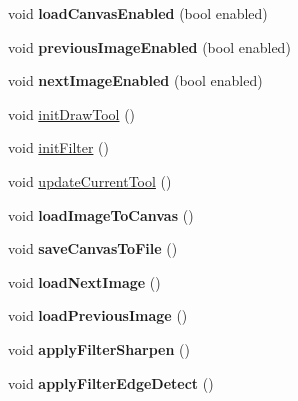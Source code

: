 \begin{DoxyCompactItemize}
\item 
void {\bfseries load\+Canvas\+Enabled} (bool enabled)\hypertarget{classMIAApp_ad1e12340d80aff74cd84757fa23abc25}{}\label{classMIAApp_ad1e12340d80aff74cd84757fa23abc25}

\item 
void {\bfseries previous\+Image\+Enabled} (bool enabled)\hypertarget{classMIAApp_a14aff5b7c19330a72f0f94a838ffd05a}{}\label{classMIAApp_a14aff5b7c19330a72f0f94a838ffd05a}

\item 
void {\bfseries next\+Image\+Enabled} (bool enabled)\hypertarget{classMIAApp_aea869031fb947572040fe6bdb4c9a6a5}{}\label{classMIAApp_aea869031fb947572040fe6bdb4c9a6a5}

\item 
void \hyperlink{classMIAApp_ae9f573664b63d839f34a97a55cfc305a}{init\+Draw\+Tool} ()
\item 
void \hyperlink{classMIAApp_a5f25e06a32d646e407474f24b8ecf43d}{init\+Filter} ()
\item 
void \hyperlink{classMIAApp_aef9e427d5b1279cf9e6fe4d17570a828}{update\+Current\+Tool} ()
\item 
void {\bfseries load\+Image\+To\+Canvas} ()\hypertarget{classMIAApp_a911e8d9fe5ef5d7c0fe4680eabd42052}{}\label{classMIAApp_a911e8d9fe5ef5d7c0fe4680eabd42052}

\item 
void {\bfseries save\+Canvas\+To\+File} ()\hypertarget{classMIAApp_a4003f9ceb1dc298abf847f69ab259608}{}\label{classMIAApp_a4003f9ceb1dc298abf847f69ab259608}

\item 
void {\bfseries load\+Next\+Image} ()\hypertarget{classMIAApp_a57ef88e2558ed69fe0ee4296dbf21bd6}{}\label{classMIAApp_a57ef88e2558ed69fe0ee4296dbf21bd6}

\item 
void {\bfseries load\+Previous\+Image} ()\hypertarget{classMIAApp_a0338ac2b7f4a79ce17f505673a7e4392}{}\label{classMIAApp_a0338ac2b7f4a79ce17f505673a7e4392}

\item 
void {\bfseries apply\+Filter\+Sharpen} ()\hypertarget{classMIAApp_ad1fc2f78000ae94b2a52b600af720af2}{}\label{classMIAApp_ad1fc2f78000ae94b2a52b600af720af2}

\item 
void {\bfseries apply\+Filter\+Edge\+Detect} ()\hypertarget{classMIAApp_a0531d51f02e34337f5ef721aca1a5883}{}\label{classMIAApp_a0531d51f02e34337f5ef721aca1a5883}


\end{DoxyCompactItemize}
